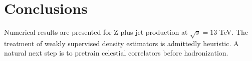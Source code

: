 \section{Conclusions}\label{sec:conclusions}

Numerical results are presented for Z plus jet production at $\sqrt{s} =
13$ TeV. The treatment of weakly supervised density estimators is
admittedly heuristic. A natural next step is to pretrain celestial
correlators before hadronization.


